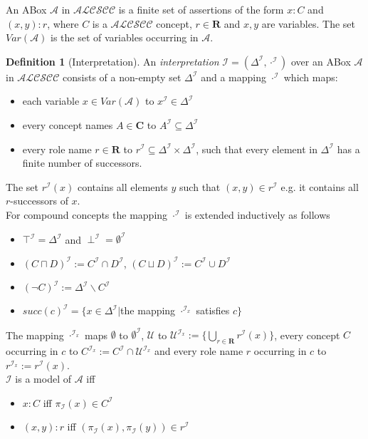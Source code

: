 \documentclass[a4paper,11pt]{scrartcl}
\theoremstyle{break}
\theoremstyle{definition}
\newtheorem{mydef}{Definition}
\begin{document}
An ABox $\mathcal{A}$ in $\mathcal{ALCSCC}$ is a finite set of assertions of the form $x:C$ and $(x,y):r$, where $C$ is a $\mathcal{ALCSCC}$ concept, $r\in\mathbf{R}$ and $x,y$ are variables. The set $Var(\mathcal{A})$ is the set of variables occurring in $\mathcal{A}$. 
\begin{mydef}[Interpretation]
An \textit{interpretation} $\mathcal{I}=(\Delta^\mathcal{I},\cdot^\mathcal{I})$ over an ABox $\mathcal{A}$ in $\mathcal{ALCSCC}$ consists of a non-empty set $\Delta^\mathcal{I}$ and a mapping $\cdot^\mathcal{I}$ which maps:
\begin{itemize}
\item each variable $x\in Var(\mathcal{A})$ to $x^\mathcal{I}\in \Delta^\mathcal{I}$
\item every concept names $A\in\mathbf{C}$ to $A^\mathcal{I}\subseteq \Delta^\mathcal{I}$
\item every role name $r\in\mathbf{R}$ to $r^\mathcal{I}\subseteq\Delta^\mathcal{I}\times\Delta^\mathcal{I}$, such that every element in $\Delta^\mathcal{I}$ has a finite number of successors.
\end{itemize}
The set $r^\mathcal{I}(x)$ contains all elements $y$ such that $(x,y)\in r^\mathcal{I}$ e.g. it contains all $r$-successors of $x$.\\
For compound concepts the mapping $\cdot^\mathcal{I}$ is extended inductively as follows
\begin{itemize}
\item $\top^\mathcal{I}=\Delta^\mathcal{I}$ and $\perp^\mathcal{I}=\emptyset^\mathcal{I}$
\item $(C\sqcap D)^\mathcal{I}:=C^\mathcal{I}\cap D^\mathcal{I}$, $(C\sqcup D)^\mathcal{I}:=C^\mathcal{I}\cup D^\mathcal{I}$
\item $(\neg C)^\mathcal{I}:=\Delta^\mathcal{I}\backslash C^\mathcal{I}$
\item $succ(c)^\mathcal{I}=\{x\in \Delta^\mathcal{I}|$the mapping $\cdot^{\mathcal{I}_x}$ satisfies $c\}$
\end{itemize}
The mapping $\cdot^{\mathcal{I}_x}$ maps $\emptyset$ to $\emptyset^\mathcal{I}$, $\mathcal{U}$ to $\mathcal{U}^{\mathcal{I}_x}:=\{\bigcup_{r\in\mathbf{R}}r^\mathcal{I}(x)\}$, every concept $C$ occurring in $c$ to $C^{\mathcal{I}_x}:=C^\mathcal{I}\cap \mathcal{U}^{\mathcal{I}_x}$ and every role name $r$ occurring in $c$ to $r^{\mathcal{I}_x}:=r^\mathcal{I}(x)$.\\
$\mathcal{I}$ is a model of $\mathcal{A}$ iff
\begin{itemize}
\item $x:C$ iff $\pi_\mathcal{I}(x)\in C^\mathcal{I}$ 
\item $(x,y):r$ iff $(\pi_\mathcal{I}(x),\pi_\mathcal{I}(y))\in r^\mathcal{I}$
\end{itemize} 
\end{mydef}
\end{document}
